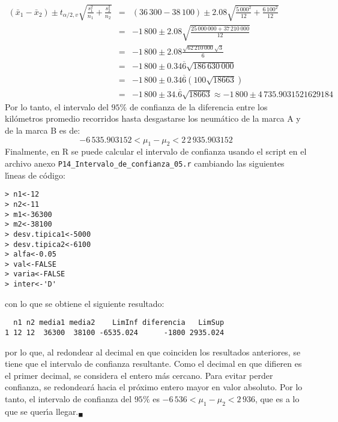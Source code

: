 \begin{solucion}
 \begin{eqnarray*}
  \left( \bar{x}_1 - \bar{x}_2 \right) \pm t_{\alpha/2,v} \sqrt{\frac{s_1^2}{n_1} + \frac{s_2^2}{n_2}}
  & = & (36\,300 - 38\,100) \pm 2.08 \sqrt{\frac{5\,000^2}{12} + \frac{6\,100^2}{12}} \\
  & = & -1\,800 \pm 2.08 \sqrt{\frac{25\,000\,000 + 37\,210\,000}{12}} \\ 
  & = & -1\,800 \pm 2.08 \frac{\sqrt{62\,210\,000}\sqrt{3}}{6} \\
  & = & -1\,800 \pm 0.34\overline{6} \sqrt{186\,630\,000} \\
  & = & -1\,800 \pm 0.34\overline{6} \left( 100\sqrt{18663} \right) \\
  & = & -1\,800 \pm 34.\overline{6}\sqrt{18663} \approx -1\,800 \pm 4\,735.9031521629184
 \end{eqnarray*}
 Por lo tanto, el intervalo del $95\%$ de confianza de la diferencia entre los kil\'ometros promedio recorridos hasta desgastarse los neum\'atico de la marca A y de la marca B es de:
 \begin{equation*}
  -6\,535.903152 < \mu_1 - \mu_2 < 2\,2\,935.903152
 \end{equation*}
 Finalmente, en R se puede calcular el intervalo de confianza usando el script en el archivo anexo \texttt{P14\_Intervalo\_de\_confianza\_05.r} cambiando las siguientes l\'{\i}neas de c\'odigo:
 \begin{verbatim}
> n1<-12
> n2<-11
> m1<-36300
> m2<-38100
> desv.tipica1<-5000
> desv.tipica2<-6100
> alfa<-0.05
> val<-FALSE
> varia<-FALSE
> inter<-'D'
 \end{verbatim}
 \vspace{-0.5cm}
 con lo que se obtiene el siguiente resultado:
 \begin{verbatim}
  n1 n2 media1 media2    LimInf diferencia   LimSup
1 12 12  36300  38100 -6535.024      -1800 2935.024
 \end{verbatim}
 \vspace{-0.5cm}
 por lo que, al redondear al decimal en que coinciden los resultados anteriores, se tiene que el intervalo de confianza resultante. Como el decimal en que difieren es el primer decimal, se considera el entero m\'as cercano. Para evitar perder confianza, se redondear\'a hacia el pr\'oximo entero mayor en valor absoluto. Por lo tanto, el intervalo de confianza del $95\%$ es $-6\,536 < \mu_1 - \mu_2 < 2\,936$, que es a lo que se quer\'{\i}a llegar.${}_{\blacksquare}$
\end{solucion}
